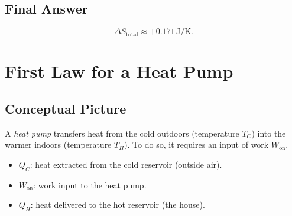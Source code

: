 \documentclass[12pt]{article}
\theoremstyle{definition} %
\theoremstyle{plain} %
\begin{document}
\subsection*{Final Answer}
\[
\Delta S_{\text{total}} \approx +0.171\,\mathrm{J/K}.
\]

  \section*{First Law for a Heat Pump}

\subsection*{Conceptual Picture}

A \textit{heat pump} transfers heat from the cold outdoors (temperature $T_C$) into the warmer indoors (temperature $T_H$). To do so, it requires an input of work $\displaystyle W_{\text{on}}$.

\begin{itemize}
    \item $\displaystyle Q_C$: heat extracted from the cold reservoir (outside air).
    \item $\displaystyle W_{\text{on}}$: work input to the heat pump.
    \item $\displaystyle Q_H$: heat delivered to the hot reservoir (the house).
\end{itemize}
\end{document}
